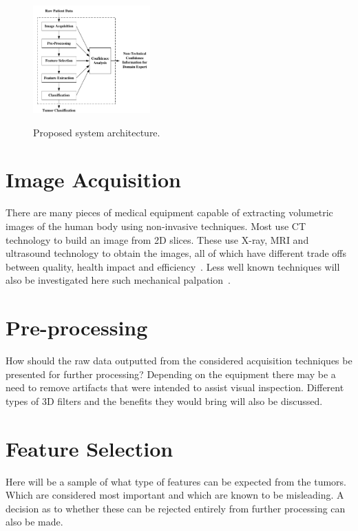 \documentclass[journal]{IEEEtran}
\begin{document}
\begin{figure}[!htb]
   \centering
   \includegraphics[width = 0.4\textwidth]{Figures/Proposed.pdf}
   \label{fig:Proposed}
   \caption{Proposed system architecture.}
\end{figure}



\section{Image Acquisition}
\label{sec:ImageAcquisition}
There are many pieces of medical equipment capable of extracting volumetric images of the human body using non-invasive techniques.
Most use CT technology to build an image from 2D slices.
These use X-ray, MRI and ultrasound technology to obtain the images, all of which have different trade offs between quality, health impact and efficiency~\cite{robb1999biomedical}.
Less well known techniques will also be investigated here such mechanical palpation~\cite{wellman1997modeling}. 




\section{Pre-processing}
\label{sec:PreProcessing}
How should the raw data outputted from the considered acquisition techniques be presented for further processing?
Depending on the equipment there may be a need to remove artifacts that were intended to assist visual inspection. 
Different types of 3D filters and the benefits they would bring will also be discussed.

\section{Feature Selection}
Here will be a sample of what type of features can be expected from the tumors.
Which are considered most important and which are known to be misleading.
A decision as to whether these can be rejected entirely from further processing can also be made. 
\end{document}
